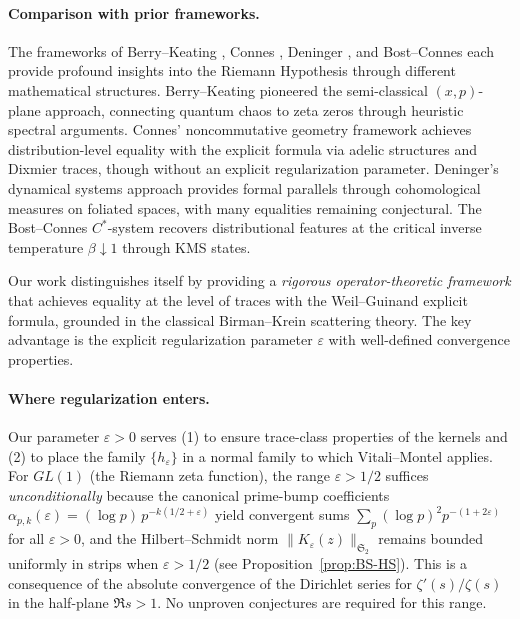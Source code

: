 ﻿\documentclass[12pt,a4paper]{article}
\theoremstyle{definition}
\theoremstyle{remark}
\begin{document}
\paragraph{Comparison with prior frameworks.}
The frameworks of Berry--Keating \cite{Berry1999,BerryKeating1999}, Connes \cite{Connes1996,Connes1999}, Deninger \cite{Deninger1998}, and Bost--Connes \cite{BostConnes1995} each provide profound insights into the Riemann Hypothesis through different mathematical structures.
Berry--Keating pioneered the semi-classical $(x,p)$-plane approach, connecting quantum chaos to zeta zeros through heuristic spectral arguments.
Connes' noncommutative geometry framework achieves distribution-level equality with the explicit formula via adelic structures and Dixmier traces, though without an explicit regularization parameter.
Deninger's dynamical systems approach provides formal parallels through cohomological measures on foliated spaces, with many equalities remaining conjectural.
The Bost--Connes $C^*$-system recovers distributional features at the critical inverse temperature $\beta\downarrow 1$ through KMS states.

Our work distinguishes itself by providing a \emph{rigorous operator-theoretic framework} that achieves equality at the level of traces with the Weil--Guinand explicit formula, grounded in the classical Birman--Krein scattering theory.
The key advantage is the explicit regularization parameter $\varepsilon$ with well-defined convergence properties.

\paragraph{Where regularization enters.}
Our parameter $\varepsilon>0$ serves (1) to ensure trace-class properties of the kernels and (2) to place the family $\{h_\varepsilon\}$ in a normal family to which Vitali--Montel applies.
For $GL(1)$ (the Riemann zeta function), the range $\varepsilon>1/2$ suffices \emph{unconditionally} because the canonical prime-bump coefficients $\alpha_{p,k}(\varepsilon)=(\log p)\,p^{-k(1/2+\varepsilon)}$ yield convergent sums $\sum_p (\log p)^2 p^{-(1+2\varepsilon)}$ for all $\varepsilon>0$, and the Hilbert--Schmidt norm $\|K_\varepsilon(z)\|_{\mathfrak{S}_2}$ remains bounded uniformly in strips when $\varepsilon>1/2$ (see Proposition~\ref{prop:BS-HS}).
This is a consequence of the absolute convergence of the Dirichlet series for $\zeta'(s)/\zeta(s)$ in the half-plane $\Re s>1$.
No unproven conjectures are required for this range.
\end{document}
